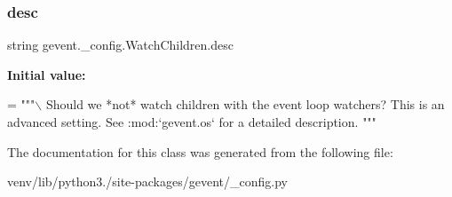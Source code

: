 \subsubsection{\texorpdfstring{desc}{desc}}
{\footnotesize\ttfamily string gevent.\+\_\+config.\+Watch\+Children.\+desc\hspace{0.3cm}{\ttfamily [static]}}

{\bfseries Initial value\+:}
\begin{DoxyCode}
=  \textcolor{stringliteral}{"""\(\backslash\)}
\textcolor{stringliteral}{Should we *not* watch children with the event loop watchers?}
\textcolor{stringliteral}{}
\textcolor{stringliteral}{This is an advanced setting.}
\textcolor{stringliteral}{}
\textcolor{stringliteral}{See :mod:`gevent.os` for a detailed description.}
\textcolor{stringliteral}{"""}
\end{DoxyCode}


The documentation for this class was generated from the following file\+:\begin{DoxyCompactItemize}
\item 
venv/lib/python3./site-\/packages/gevent/\+\_\+config.\+py\end{DoxyCompactItemize}
